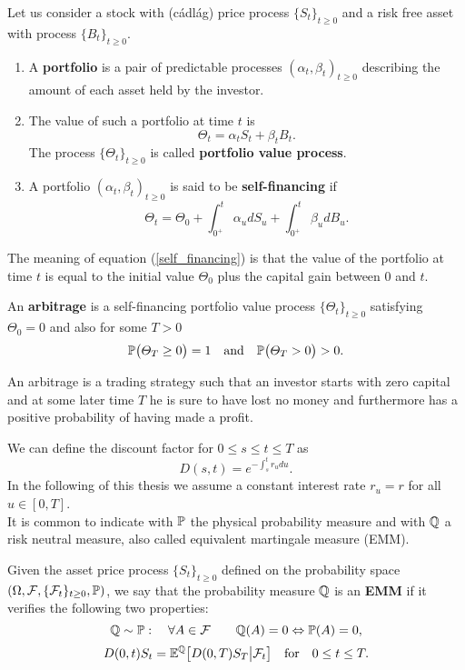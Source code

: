 \begin{Definition}
 Let us consider a stock with (cádlág) price process $\{S_t\}_{t\geq0}$ and a risk free asset with process $\{B_t\}_{t\geq0}$.
 \begin{enumerate}
  \item A \textbf{portfolio} is a pair of predictable processes $(\alpha_t, \beta_t)_{t\geq0}$ describing the amount of each asset held by the investor. 
  \item The value of such a portfolio at time $t$ is
  $$ \varTheta_t = \alpha_t S_t + \beta_t B_t. $$
  The process $\{\varTheta_t\}_{t\geq0}$ is called \textbf{portfolio value process}.
  \item A portfolio $(\alpha_t, \beta_t)_{t\geq0}$ is said to be \textbf{self-financing} if 
  \begin{equation}\label{self_financing}
     \varTheta_t = \varTheta_0 + \int_{0^+}^t \alpha_u dS_u + \int_{0^+}^t \beta_u dB_u. 
  \end{equation}
\end{enumerate}
\end{Definition}
The meaning of equation (\ref{self_financing}) is that the value of the portfolio at time $t$ is equal to the initial value $\varTheta_0$ plus
the capital gain between $0$ and $t$.

\begin{Definition}\label{arbitrage_def}
 An \textbf{arbitrage} is a self-financing portfolio value process $\{\varTheta_t\}_{t\geq0}$ satisfying $\varTheta_0=0$ and also for some $T>0$
 $$ \mathbb{P}\bigl( \varTheta_T \geq 0 \bigr) = 1 \quad \mbox{and} \quad \mathbb{P}\bigl( \varTheta_T > 0 \bigr) > 0. $$
\end{Definition}
An arbitrage is a trading strategy such that an investor starts with zero capital and at some later time $T$ he is sure to have lost no money and furthermore has a positive
probability of having made a profit.

We can define the discount factor for $0 \leq s \leq t \leq T$ as
\begin{equation}\label{discount_factor}
 D(s,t) = e^{-\int_s^t r_u du}.
\end{equation}
In the following of this thesis we assume a constant interest rate $r_u = r$ for all $u \in [0,T]$. \\
It is common to indicate with $\mathbb{P}$ the physical probability measure and with $\mathbb{Q}$ a risk neutral measure, also called equivalent martingale measure (EMM).
\begin{Definition}
 Given the asset price process $\{S_t\}_{t\geq0}$ defined on the probability space 
 $(\Omega,\mathcal{F},\{\mathcal{F}_{t}\}_{t\geq0},\mathbb{P})$, we say that the probability measure $\mathbb{Q}$ is an \textbf{EMM}
 if it verifies the following two properties:
 \begin{equation}
 \mathbb{Q} \sim \mathbb{P} : \quad \forall A \in \mathcal{F} \quad \quad \mathbb{Q}(A) = 0 \Leftrightarrow \mathbb{P}(A) = 0,  
 \end{equation}
\begin{equation}
 D(0,t) S_t = \mathbb{E}^{\mathbb{Q}} \bigl[ D(0,T) S_T \big| \mathcal{F}_t \bigr] \quad \mbox{for} \quad 0\leq t \leq T.
\end{equation}
\end{Definition}


